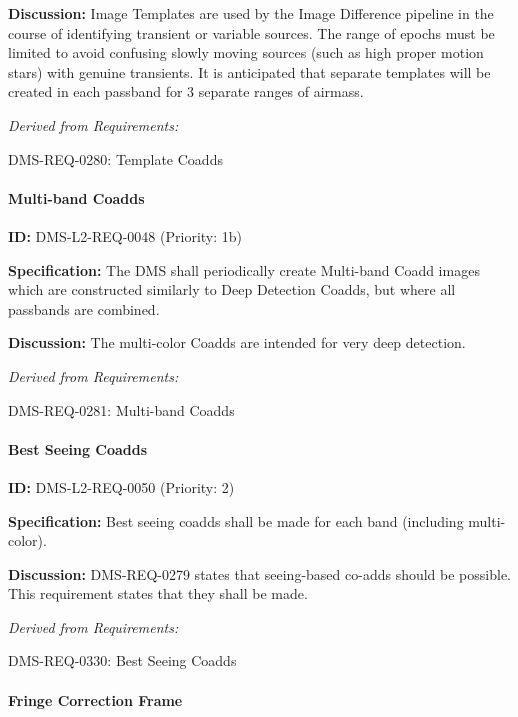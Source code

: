 \documentclass[SE,toc,lsstdraft]{lsstdoc}
\begin{document}
\textbf{Discussion: }Image Templates are used by the Image Difference pipeline in the course of identifying transient or variable sources. The range of epochs must be limited to avoid confusing slowly moving sources (such as high proper motion stars) with genuine transients. It is anticipated that separate templates will be created in each passband for 3 separate ranges of airmass.

\emph{Derived from Requirements:}

DMS-REQ-0280:
Template Coadds \newline

\paragraph{Multi-band Coadds}\hfill  %

\label{DMS-L2-REQ-0048}
\textbf{ID:} DMS-L2-REQ-0048 (Priority: 1b)

\textbf{Specification:} The DMS shall periodically create Multi-band Coadd images which are constructed similarly to Deep Detection Coadds, but where all passbands are combined.

\textbf{Discussion: }The multi-color Coadds are intended for very deep detection.

\emph{Derived from Requirements:}

DMS-REQ-0281:
Multi-band Coadds \newline

\paragraph{Best Seeing Coadds}\hfill  %

\label{DMS-L2-REQ-0050}
\textbf{ID:} DMS-L2-REQ-0050 (Priority: 2)

\textbf{Specification:} Best seeing coadds shall be made for each band (including multi-color).

\textbf{Discussion:} DMS-REQ-0279 states that seeing-based co-adds should be possible. This requirement states that they shall be made.

\emph{Derived from Requirements:}

DMS-REQ-0330:
Best Seeing Coadds \newline

\paragraph{Fringe Correction Frame}\hfill  %
\end{document}
